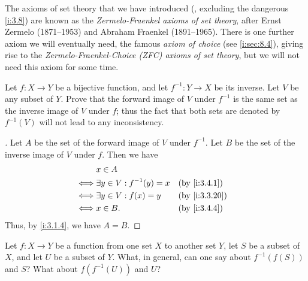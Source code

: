 \setcounter{thm}{11}
\begin{rmk}\label{i:3.4.12}
  The axioms of set theory that we have introduced (, excluding the dangerous \cref{i:3.8}) are known as the \emph{Zermelo-Fraenkel axioms of set theory}, after Ernst Zermelo (1871--1953) and Abraham Fraenkel (1891--1965).
  There is one further axiom we will eventually need, the famous \emph{axiom of choice} (see \cref{i:sec:8.4}), giving rise to the \emph{Zermelo-Fraenkel-Choice (ZFC) axioms of set theory}, but we will not need this axiom for some time.
\end{rmk}

\exercisesection

\begin{ex}\label{i:ex:3.4.1}
  Let \(f : X \to Y\) be a bijective function, and let \(f^{-1} : Y \to X\) be its inverse.
  Let \(V\) be any subset of \(Y\).
  Prove that the forward image of \(V\) under \(f^{-1}\) is the same set as the inverse image of \(V\) under \(f\);
  thus the fact that both sets are denoted by \(f^{-1}(V)\) will not lead to any inconsistency.
\end{ex}

\begin{proof}[]
  Let \(A\) be the set of the forward image of \(V\) under \(f^{-1}\).
  Let \(B\) be the set of the inverse image of \(V\) under \(f\).
  Then we have
  \begin{align*}
         & x \in A                                            \\
    \iff & \exists y \in V : f^{-1}(y) = x &  & \by{i:3.4.1}  \\
    \iff & \exists y \in V : f(x) = y      &  & \by{i:3.3.20} \\
    \iff & x \in B.                        &  & \by{i:3.4.4}
  \end{align*}
  Thus, by \cref{i:3.1.4}, we have \(A = B\).
\end{proof}

\begin{ex}\label{i:ex:3.4.2}
  Let \(f : X \to Y\) be a function from one set \(X\) to another set \(Y\), let \(S\) be a subset of \(X\), and let \(U\) be a subset of \(Y\).
  What, in general, can one say about \(f^{-1}(f(S))\) and \(S\)?
  What about \(f(f^{-1}(U))\) and \(U\)?
\end{ex}

